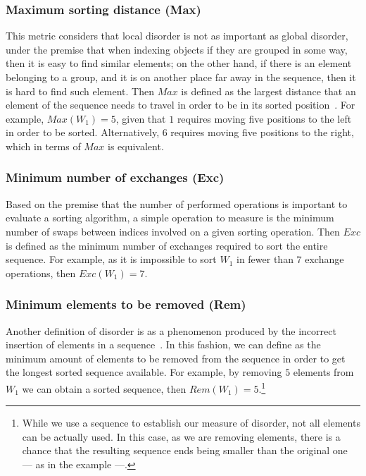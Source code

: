 \subsubsection{Maximum sorting distance (Max)}
This metric considers that local disorder is not as important as global disorder, under the premise that when indexing objects if they are grouped in some way, then it is easy to find similar elements; on the other hand, if there is an element belonging to a group, and it is on another place far away in the sequence, then it is hard to find such element. Then $Max$ is defined as the largest distance that an element of the sequence needs to travel in order to be in its sorted position~\cite{Estivill-Castro_Wood_1989}. For example, $Max(W_1) = 5$, given that $1$ requires moving five positions to the left in order to be sorted. Alternatively, $6$ requires moving five positions to the right, which in terms of $Max$ is equivalent.\\

\subsubsection{Minimum number of exchanges (Exc)}
Based on the premise that the number of performed operations is important to evaluate a sorting algorithm, a simple operation to measure is the minimum number of swaps between indices involved on a given sorting operation. Then $Exc$ is defined as the minimum number of exchanges required to sort the entire sequence\cite{Mannila_1985}. For example, as it is impossible to sort $W_1$ in fewer than $7$ exchange operations, then $Exc(W_1)=7$.\\

\subsubsection{Minimum elements to be removed (Rem)}
Another definition of disorder is as a phenomenon produced by the incorrect insertion of elements in a sequence~\cite{10.5555/270146}. In this fashion, we can define as the minimum amount of elements to be removed from the sequence in order to get the longest sorted sequence available. For example, by removing $5$ elements from $W_1$ we can obtain a sorted sequence, then $Rem(W_1) = 5$.\footnote{While we use a sequence to establish our measure of disorder, not all elements can be actually used. In this case, as we are removing elements, there is a chance that the resulting sequence ends being smaller than the original one --- as in the example ---.}

